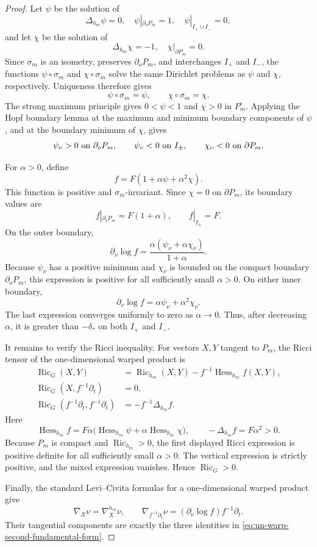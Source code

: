\documentclass[11pt,reqno]{amsart}
\theoremstyle{definition}
\numberwithin{equation}{section}
\DeclareMathOperator{\Ric}{Ric}
\DeclareMathOperator{\Hess}{Hess}
\begin{document}
\begin{proof}
Let \(\psi\) be the solution of
\[
 \Delta_{h_m}\psi=0,\quad \psi|_{\partial_oP_m}=1,
 \quad \psi|_{I_+\cup I_-}=0,
\]
and let \(\chi\) be the solution of
\[
 \Delta_{h_m}\chi=-1,\quad \chi|_{\partial P_m}=0.
\]
Since \(\sigma_m\) is an isometry, preserves \(\partial_oP_m\), and
interchanges \(I_+\) and \(I_-\), the functions
\(\psi\circ\sigma_m\) and \(\chi\circ\sigma_m\) solve the same Dirichlet
problems as \(\psi\) and \(\chi\), respectively.  Uniqueness therefore gives
\[
                       \psi\circ\sigma_m=\psi,
                 \qquad \chi\circ\sigma_m=\chi.
\]
The strong maximum principle gives \(0<\psi<1\) and \(\chi>0\) in
\(P_m^\circ\).  Applying the Hopf boundary lemma at the maximum and
minimum boundary components of \(\psi\), and at the boundary minimum of
\(\chi\), gives
\[
 \psi_\nu>0\ \hbox{on }\partial_oP_m,\qquad
 \psi_\nu<0\ \hbox{on }I_\pm,\qquad
 \chi_\nu<0\ \hbox{on }\partial P_m.
\]

For \(\alpha>0\), define
\[
                   f=F(1+\alpha\psi+\alpha^2\chi).
\]
This function is positive and \(\sigma_m\)-invariant.  Since \(\chi=0\) on
\(\partial P_m\), its boundary values are
\[
 f|_{\partial_oP_m}=F(1+\alpha),
 \qquad f|_{I_\pm}=F.
\]
On the outer boundary,
\[
 \partial_\nu\log f
 =\frac{\alpha(\psi_\nu+\alpha\chi_\nu)}{1+\alpha}.
\]
Because \(\psi_\nu\) has a positive minimum and \(\chi_\nu\) is bounded on
the compact boundary \(\partial_oP_m\), this expression is positive for
all sufficiently small \(\alpha>0\).
On either inner boundary,
\[
 \partial_\nu\log f
 =\alpha\psi_\nu+\alpha^2\chi_\nu.
\]
The last expression converges uniformly to zero as \(\alpha\to0\).
Thus, after decreasing \(\alpha\), it is greater than \(-\delta_*\) on
both \(I_+\) and \(I_-\).

It remains to verify the Ricci inequality.  For vectors \(X,Y\) tangent
to \(P_m\), the Ricci tensor of the one-dimensional warped product is
\begin{align*}
 \Ric_G(X,Y)
 &=\Ric_{h_m}(X,Y)-f^{-1}\Hess_{h_m}f(X,Y),\\
 \Ric_G(X,f^{-1}\partial_t)&=0,\\
 \Ric_G(f^{-1}\partial_t,f^{-1}\partial_t)
 &=-f^{-1}\Delta_{h_m}f.
\end{align*}
Here
\[
 \Hess_{h_m}f=F\alpha
       \bigl(\Hess_{h_m}\psi+\alpha\Hess_{h_m}\chi\bigr),
 \qquad
 -\Delta_{h_m}f=F\alpha^2>0.
\]
Because \(P_m\) is compact and \(\Ric_{h_m}>0\), the first displayed
Ricci expression is positive definite for all sufficiently small
\(\alpha>0\).  The vertical expression is strictly positive, and the
mixed expression vanishes.  Hence \(\Ric_G>0\).

Finally, the standard Levi--Civita formulas for a one-dimensional
warped product give
\[
 \nabla_X\nu=\nabla^{h_m}_X\nu,
 \qquad
 \nabla_{f^{-1}\partial_t}\nu
   =(\partial_\nu\log f)f^{-1}\partial_t.
\]
Their tangential components are exactly the three identities in
\eqref{eq:un-warp-second-fundamental-form}.
\end{proof}
\end{document}
